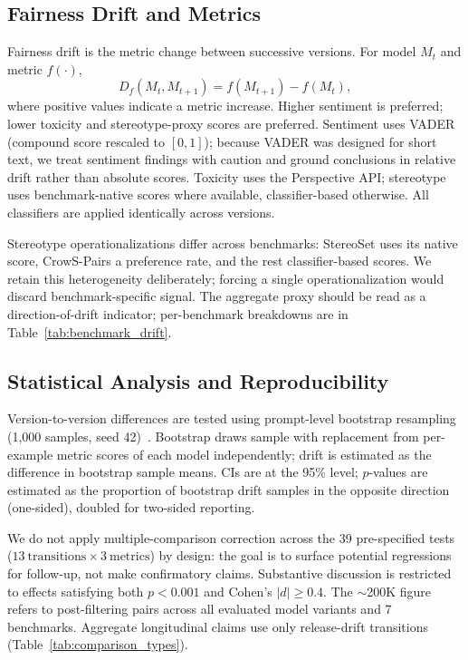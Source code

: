 \documentclass[11pt]{article}
\begin{document}
\subsection{Fairness Drift and Metrics}
Fairness drift is the metric change between successive versions. For model $M_t$ and metric $f(\cdot)$,
\[D_f(M_t, M_{t+1}) = f(M_{t+1}) - f(M_t),\]
where positive values indicate a metric increase. Higher sentiment is preferred; lower toxicity and stereotype-proxy scores are preferred. Sentiment uses VADER (compound score rescaled to $[0,1]$); because VADER was designed for short text, we treat sentiment findings with caution and ground conclusions in relative drift rather than absolute scores. Toxicity uses the Perspective API; stereotype uses benchmark-native scores where available, classifier-based otherwise. All classifiers are applied identically across versions.

Stereotype operationalizations differ across benchmarks: StereoSet uses its native score, CrowS-Pairs a preference rate, and the rest classifier-based scores. We retain this heterogeneity deliberately; forcing a single operationalization would discard benchmark-specific signal. The aggregate proxy should be read as a direction-of-drift indicator; per-benchmark breakdowns are in Table~\ref{tab:benchmark_drift}.

\subsection{Statistical Analysis and Reproducibility}
Version-to-version differences are tested using prompt-level bootstrap resampling (1,000 samples, seed 42)~\citep{efron1994bootstrap}. Bootstrap draws sample with replacement from per-example metric scores of each model independently; drift is estimated as the difference in bootstrap sample means. CIs are at the 95\% level; $p$-values are estimated as the proportion of bootstrap drift samples in the opposite direction (one-sided), doubled for two-sided reporting.

We do not apply multiple-comparison correction across the 39 pre-specified tests ($13\ \text{transitions} \times 3\ \text{metrics}$) by design: the goal is to surface potential regressions for follow-up, not make confirmatory claims. Substantive discussion is restricted to effects satisfying both $p < 0.001$ and Cohen's $|d| \geq 0.4$. The $\sim$200K figure refers to post-filtering pairs across all evaluated model variants and 7 benchmarks. Aggregate longitudinal claims use only release-drift transitions (Table~\ref{tab:comparison_types}).
\end{document}
